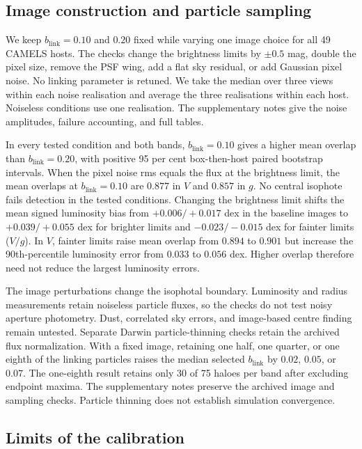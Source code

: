\documentclass[usenatbib]{mnras}
\begin{document}
\subsection{Image construction and particle sampling}
\label{sec:sensitivity}

We keep $b_{\mathrm{link}}=0.10$ and $0.20$ fixed while varying one image choice for
all 49 CAMELS hosts. The checks change the brightness limits by
$\pm0.5$ mag, double the pixel size, remove the PSF wing, add a flat
sky residual, or add Gaussian pixel noise. No linking parameter is
retuned. We take the median over three views within each noise
realisation and average the three realisations within each host.
Noiseless conditions use one realisation. The supplementary notes
give the noise amplitudes, failure accounting, and full tables.

In every tested condition and both bands, $b_{\mathrm{link}}=0.10$ gives a higher mean
overlap than $b_{\mathrm{link}}=0.20$, with positive 95 per cent box-then-host paired
bootstrap intervals. When the pixel noise rms equals the flux at the
brightness limit, the mean overlaps at $b_{\mathrm{link}}=0.10$ are $0.877$ in $V$
and $0.857$ in $g$. No central isophote fails detection in the tested
conditions. Changing the brightness limit shifts the mean signed
luminosity bias from $+0.006/+0.017$ dex in the baseline images to
$+0.039/+0.055$ dex for brighter limits and $-0.023/-0.015$ dex for
fainter limits ($V/g$). In $V$, fainter limits raise mean overlap from
$0.894$ to $0.901$ but increase the 90th-percentile luminosity error
from $0.033$ to $0.056$ dex. Higher overlap therefore need not reduce
the largest luminosity errors.

The image perturbations change the isophotal boundary. Luminosity and
radius measurements retain noiseless particle fluxes, so the checks
do not test noisy aperture photometry. Dust, correlated sky errors,
and image-based centre finding remain untested.
Separate Darwin particle-thinning checks retain the archived flux
normalization. With a fixed image, retaining one half, one quarter,
or one eighth of the linking particles raises the median selected $b_{\mathrm{link}}$
by $0.02$, $0.05$, or $0.07$. The one-eighth result retains only
30 of 75 haloes per band after excluding endpoint maxima. The
supplementary notes preserve the archived image and sampling checks.
Particle thinning does not establish simulation convergence.

\subsection{Limits of the calibration}
\end{document}
